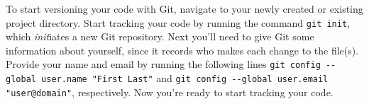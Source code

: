 To start versioning your code with Git, navigate to your newly created or existing project directory. Start tracking your code by running the command \verb|git init|, which \textit{init}iates a new Git repository. Next you'll need to give Git some information about yourself, since it records who makes each change to the file(s). Provide your name and email by running the following lines \verb|git config --global user.name "First Last"| and \verb|git config --global user.email "user@domain"|, respectively. Now you're ready to start tracking your code.
